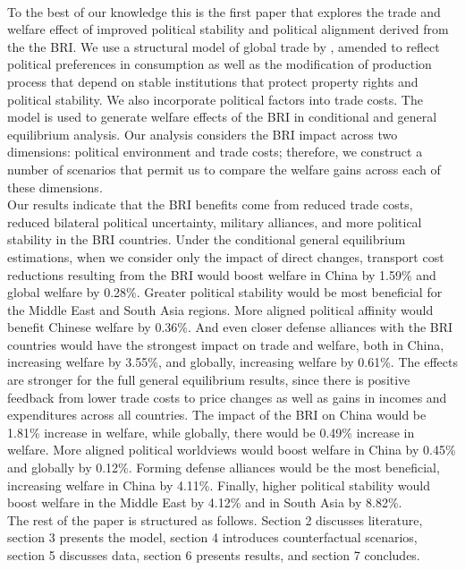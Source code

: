  \\
 \indent To the best of our knowledge this is the first paper that explores the trade and welfare effect of improved political stability and political alignment derived from the the BRI. We use a  structural model of global trade by \cite{Anderson2018GEPPML:PPML}, amended to reflect political preferences in consumption as well as the modification of production process that depend on stable institutions that protect property rights and political stability. We also incorporate political factors into trade costs. The model is used to generate welfare effects of the BRI in conditional and general equilibrium analysis. Our analysis considers the BRI impact across two dimensions: political environment and trade costs; therefore, we construct a number of scenarios that permit us to compare the welfare gains across each of these dimensions. 
\\
\indent Our results indicate that the BRI benefits come from reduced trade costs, reduced bilateral political uncertainty, military alliances, and more political stability in the BRI countries. Under the conditional general equilibrium estimations, when we consider only the impact of direct changes, transport cost reductions resulting from the BRI would boost welfare in China by 1.59\% and global welfare by 0.28\%. Greater political stability would be most beneficial for the Middle East and South Asia regions. More aligned political affinity would benefit Chinese welfare by 0.36\%.  And even closer defense alliances with the BRI countries would have the strongest impact on trade and welfare, both in China, increasing welfare by 3.55\%, and globally, increasing welfare by 0.61\%.
The effects are stronger for the full general equilibrium results, since there is positive feedback from lower trade costs to price changes as well as gains in incomes and expenditures across all countries. The impact of the BRI on China would be 1.81\% increase in welfare, while globally, there would be 0.49\% increase in welfare. More aligned political worldviews would boost welfare in China by 0.45\% and globally by 0.12\%.  Forming defense alliances would be the most beneficial, increasing welfare in China by 4.11\%. Finally, higher political stability would boost welfare in the Middle East by 4.12\% and in South Asia by 8.82\%.
\\
\indent The rest of the paper is structured as follows. Section 2 discusses literature, section 3 presents the model, section 4 introduces counterfactual scenarios, section 5 discusses data, section 6 presents results, and section 7 concludes.
